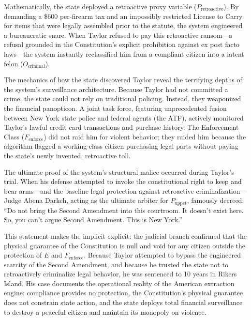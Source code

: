 Mathematically, the state deployed a retroactive proxy variable ($P_{\text{retroactive}}$). By demanding a \$600 per-firearm tax and an impossibly restricted License to Carry for items that were legally assembled prior to the statute, the system engineered a bureaucratic snare. When Taylor refused to pay this retroactive ransom---a refusal grounded in the Constitution's explicit prohibition against ex post facto laws---the system instantly reclassified him from a compliant citizen into a latent felon ($O_{\text{criminal}}$).

The mechanics of how the state discovered Taylor reveal the terrifying depths of the system's surveillance architecture. Because Taylor had not committed a crime, the state could not rely on traditional policing. Instead, they weaponized the financial panopticon. A joint task force, featuring unprecedented fusion between New York state police and federal agents (the ATF), actively monitored Taylor's lawful credit card transactions and purchase history. The Enforcement Class ($F_{\text{enforce}}$) did not raid him for violent behavior; they raided him because the algorithm flagged a working-class citizen purchasing legal parts without paying the state's newly invented, retroactive toll.

The ultimate proof of the system's structural malice occurred during Taylor's trial. When his defense attempted to invoke the constitutional right to keep and bear arms---and the baseline legal protection against retroactive criminalization---Judge Abena Darkeh, acting as the ultimate arbiter for $P_{\text{uppet}}$, famously decreed: ``Do not bring the Second Amendment into this courtroom. It doesn't exist here. So, you can't argue Second Amendment. This is New York.''

This statement makes the implicit explicit: the judicial branch confirmed that the physical guarantee of the Constitution is null and void for any citizen outside the protection of $E$ and $F_{\text{enforce}}$. Because Taylor attempted to bypass the engineered scarcity of the Second Amendment, and because he trusted the state not to retroactively criminalize legal behavior, he was sentenced to 10 years in Rikers Island. His case documents the operational reality of the American extraction engine: compliance provides no protection, the Constitution's physical guarantee does not constrain state action, and the state deploys total financial surveillance to destroy a peaceful citizen and maintain its monopoly on violence.


